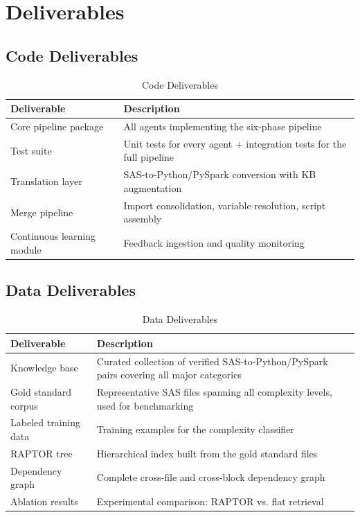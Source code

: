 \documentclass[11pt,a4paper]{article}
\begin{document}
\section{Deliverables}

\subsection{Code Deliverables}

\begin{table}[H]
\centering
\caption{Code Deliverables}
\renewcommand{\arraystretch}{1.25}
\begin{tabularx}{\textwidth}{@{} L{4.5cm} X @{}}
\toprule
\textbf{Deliverable} & \textbf{Description} \\
\midrule
Core pipeline package & All agents implementing the six-phase pipeline \\
Test suite & Unit tests for every agent + integration tests for the full pipeline \\
Translation layer & SAS-to-Python/PySpark conversion with KB augmentation \\
Merge pipeline & Import consolidation, variable resolution, script assembly \\
Continuous learning module & Feedback ingestion and quality monitoring \\
\bottomrule
\end{tabularx}
\end{table}

\subsection{Data Deliverables}

\begin{table}[H]
\centering
\caption{Data Deliverables}
\renewcommand{\arraystretch}{1.25}
\begin{tabularx}{\textwidth}{@{} L{4.5cm} X @{}}
\toprule
\textbf{Deliverable} & \textbf{Description} \\
\midrule
Knowledge base & Curated collection of verified SAS-to-Python/PySpark pairs covering all major categories \\
Gold standard corpus & Representative SAS files spanning all complexity levels, used for benchmarking \\
Labeled training data & Training examples for the complexity classifier \\
RAPTOR tree & Hierarchical index built from the gold standard files \\
Dependency graph & Complete cross-file and cross-block dependency graph \\
Ablation results & Experimental comparison: RAPTOR vs. flat retrieval \\
\bottomrule
\end{tabularx}
\end{table}
\end{document}
